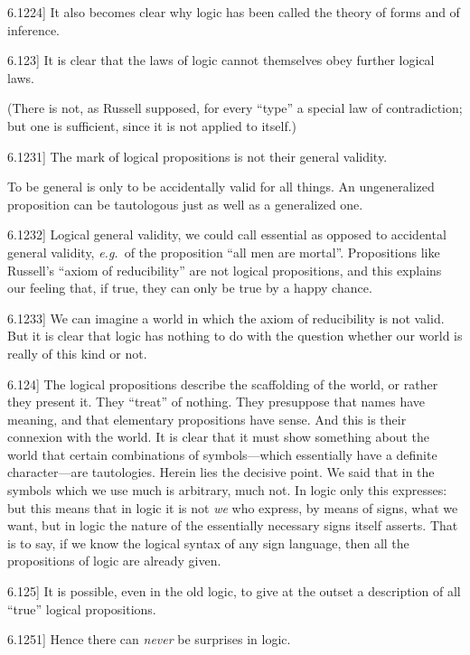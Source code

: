 \documentclass[12pt,oneside]{book}[2007/10/19]
\newcommand{\PropositionE}[2]{%
  \item[\phantomsection\label{PropE:#1}\PropGRef{#1}] #2%
}
\newcommand{\PropGRef}[1]{\hyperref[PropG:#1]{#1}}
\newcommand{\exempliGratia}{\textit{e.g.}}
\begin{document}
\begin{propositions}
\PropositionE{6.1224}
{It also becomes clear why logic has been called
the theory of forms and of inference.}


\PropositionE{6.123}
{It is clear that the laws of logic cannot themselves
obey further logical laws.

(There is not, as Russell supposed, for every
``type'' a special law of contradiction; but one is
sufficient, since it is not applied to itself.)}


\PropositionE{6.1231}
{The mark of logical propositions is not their
general validity.

To be general is only to be accidentally valid
for all things. An ungeneralized proposition can
be tautologous just as well as a generalized
one.}


\PropositionE{6.1232}
{Logical general validity, we could call essential
as opposed to accidental general validity, \exempliGratia\ of the
proposition ``all men are mortal''. Propositions
like Russell's ``axiom of reducibility'' are not
logical propositions, and this explains our feeling
that, if true, they can only be true by a happy
chance.}


\PropositionE{6.1233}
{We can imagine a world in which the axiom of
reducibility is not valid. But it is clear that logic
has nothing to do with the question whether our
world is really of this kind or not.}


\PropositionE{6.124}
{The logical propositions describe the scaffolding
of the world, or rather they present it. They
``treat'' of nothing. They presuppose that names
have meaning, and that elementary propositions
have sense. And this is their connexion with the
world. It is clear that it must show something
about the world that certain combinations of symbols---which
essentially have a definite character---are
tautologies. Herein lies the decisive point. We
said that in the symbols which we use much is
arbitrary, much not. In logic only this expresses:
but this means that in logic it is not \emph{we} who express,
by means of signs, what we want, but in logic the
nature of the essentially necessary signs itself
asserts. That is to say, if we know the logical
syntax of any sign language, then all the propositions
of logic are already given.}


\PropositionE{6.125}
{It is possible, even in the old logic, to give
at the outset a description of all ``true'' logical
propositions.}


\PropositionE{6.1251}
{Hence there can \emph{never} be surprises in logic.}



\end{propositions}
\end{document}
